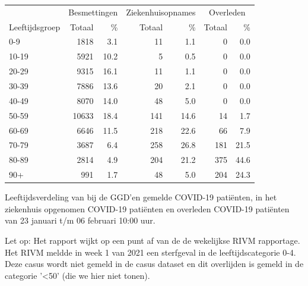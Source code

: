 \documentclass[
  english,
  man,floatsintext]{apa6}
\begin{document}
\begin{table}[H]
\centering\begingroup\fontsize{11}{13}\selectfont

\begin{threeparttable}
\begin{tabular}{lrrrrrr}
\toprule
\multicolumn{1}{c}{ } & \multicolumn{2}{c}{Besmettingen} & \multicolumn{2}{c}{Ziekenhuisopnames} & \multicolumn{2}{c}{Overleden} \\
\cmidrule(l{3pt}r{3pt}){2-3} \cmidrule(l{3pt}r{3pt}){4-5} \cmidrule(l{3pt}r{3pt}){6-7}
Leeftijdsgroep & Totaal & \% & Totaal & \% & Totaal & \%\\
\midrule
0-9 & 1818 & 3.1 & 11 & 1.1 & 0 & 0.0\\
10-19 & 5921 & 10.2 & 5 & 0.5 & 0 & 0.0\\
20-29 & 9315 & 16.1 & 11 & 1.1 & 0 & 0.0\\
30-39 & 7886 & 13.6 & 20 & 2.1 & 0 & 0.0\\
40-49 & 8070 & 14.0 & 48 & 5.0 & 0 & 0.0\\
50-59 & 10633 & 18.4 & 141 & 14.6 & 14 & 1.7\\
60-69 & 6646 & 11.5 & 218 & 22.6 & 66 & 7.9\\
70-79 & 3687 & 6.4 & 258 & 26.8 & 181 & 21.5\\
80-89 & 2814 & 4.9 & 204 & 21.2 & 375 & 44.6\\
90+ & 991 & 1.7 & 48 & 5.0 & 204 & 24.3\\
\bottomrule
\end{tabular}
\begin{tablenotes}
\item[1] Leeftijdsverdeling van bij de GGD’en gemelde COVID-19 patiënten, in het ziekenhuis opgenomen COVID-19 patiënten en overleden COVID-19 patiënten van 23 januari t/m 06 februari 10:00 uur.
\item[2] Let op: Het rapport wijkt op een punt af van de de wekelijkse RIVM rapportage. Het RIVM meldde in week 1 van 2021 een sterfgeval in de leeftijdscategorie 0-4. Deze casus wordt niet gemeld in de casus dataset en dit overlijden is gemeld in de categorie '<50' (die we hier niet tonen).
\end{tablenotes}
\end{threeparttable}
\endgroup{}
\end{table}

\newpage
\end{document}
